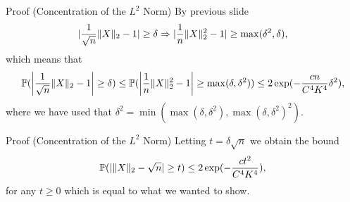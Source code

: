 \documentclass{beamer}
\begin{document}
  \begin{frame}{Proof (Concentration of the \(L^{2}\) Norm)}
    By previous slide
    \begin{equation}
      \abs{\frac{1}{\sqrt{n}}\norm{X}_{2} - 1} \geq \delta \Rightarrow \abs{\frac{1}{n}\norm{X}^{2}_{2} - 1} \geq \max(\delta^{2}, \delta),
    \end{equation}
    \pause which means that
    \begin{equation}
      \Pr(\abs*{\frac{1}{\sqrt{n}}\norm{X}_{2} - 1} \geq \delta) \leq \Pr(\abs*{\frac{1}{n}\norm{X}^{2}_{2} - 1} \geq \max(\delta, \delta^{2})) \leq 2 \exp(-\frac{cn}{C^{4}K^{4}}\delta^{2}),
    \end{equation}
    where we have used that \(\delta^{2} = \min(\max(\delta, \delta^{2}), \max(\delta, \delta^{2})^{2})\).
  \end{frame}

  \begin{frame}{Proof (Concentration of the \(L^{2}\) Norm)}
    Letting \(t = \delta \sqrt{n}\) we obtain the bound
    \begin{equation}
      \Pr(\abs{\norm{X}_{2} - \sqrt{n}} \geq t) \leq 2\exp(-\frac{ct^{2}}{C^{4}K^{4}}),
    \end{equation}
    for any \(t \geq 0\) which is equal to what we wanted to show.
  \end{frame}
\end{document}
